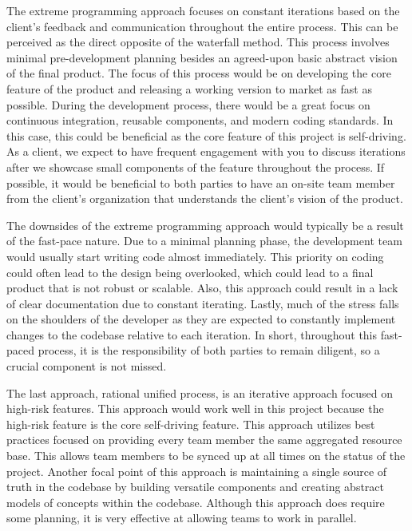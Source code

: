 \documentclass[12pt]{article}
\begin{document}
\begin{flushleft}
The extreme programming approach focuses on constant iterations based on the client's feedback and communication throughout
the entire process. This can be perceived as the direct opposite of the waterfall method. This process involves minimal pre-development 
planning besides an agreed-upon basic abstract vision of the final product. The focus of this process would be
on developing the core feature of the product and releasing a working version to market as fast as possible. During the development
process, there would be a great focus on continuous integration, reusable components, and modern coding standards. In this case, this 
could be beneficial as the core feature of this project is self-driving. As a client, we expect to have frequent engagement with
you to discuss iterations after we showcase small components of the feature throughout the process. If possible, it would
be beneficial to both parties to have an on-site team member from the client's organization that understands the client's vision of
the product.

The downsides of the extreme programming approach would typically be a result of the fast-pace nature. Due to a minimal planning phase,
the development team would usually start writing code almost immediately. This priority on coding could often lead to the design being overlooked,
which could lead to a final product that is not robust or scalable. Also, this approach could result in a lack of clear documentation due to constant 
iterating. Lastly, much of the stress falls on the shoulders of the developer as they are expected to constantly implement changes
to the codebase relative to each iteration. In short, throughout this fast-paced process, it is the responsibility of both parties to remain
diligent, so a crucial component is not missed.

The last approach, rational unified process, is an iterative approach focused on high-risk features. This approach would work well in this project because
the high-risk feature is the core self-driving feature. This approach utilizes best practices focused on providing every team member the same aggregated 
resource base. This allows team members to be synced up at all times on the status of the project. Another focal point of this approach is maintaining
a single source of truth in the codebase by building versatile components and creating abstract models of concepts within the codebase. Although this
approach does require some planning, it is very effective at allowing teams to work in parallel.


\end{flushleft}
\end{document}
